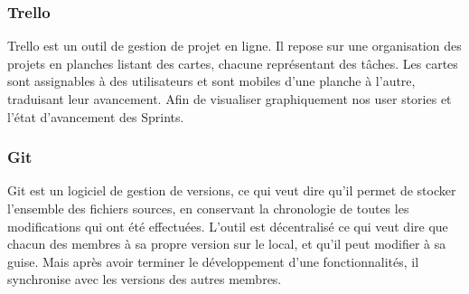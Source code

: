 \subsubsection{Trello} %
\label{ssub:subsubsection_name}

Trello est un outil de gestion de projet en ligne. Il repose sur une organisation des projets en planches listant des cartes, chacune représentant des tâches. Les cartes sont assignables à des utilisateurs et sont mobiles d'une planche à l'autre, traduisant leur avancement. Afin de visualiser graphiquement nos user stories et l’état d'avancement des Sprints.


\subsubsection{Git} %
\label{ssub:git}

Git est un logiciel de gestion de versions, ce qui veut dire qu'il permet de stocker l’ensemble des fichiers sources, en conservant la chronologie de toutes les modifications qui ont été effectuées.\newline
L'outil est décentralisé ce qui veut dire que chacun des membres à sa propre version sur le local, et qu'il peut modifier à sa guise. Mais après avoir terminer le développement d'une fonctionnalités, il synchronise avec les versions des autres membres.

